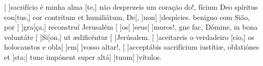 {    {[ ]{sa}crifício é minha alma [te,] não desprezeis um coração do!},
  {fícium Deo spíritus con[tus,] cor contrítum et humiliátum, De[, ]{non}[ ]{de}{spíci}es.}%
    { benigno com Sião, por [ ]{gra}[ça,] reconstruí Jerusalém [ ]{os}[ ]{seus}[ ]{mu}ros!},
  {gne fac, Dómine, in bona voluntáte [ ]{Si}[\-on,] ut ædificéntur [ ]{Je}{rúsa}lem.}%
    {[ ]{a}ceitareis o verdadeiro [cio,] os holocaustos e obla[ ]{em}[ ]{vos}{so al}tar!},
  {[ ]{ac}ceptábis sacrifícium iustítiæ, oblatiónes et [\-sta;] tunc impónent super altá[ ]{tu}{um}[ ]{vítu}\-los.}%
    {}
}